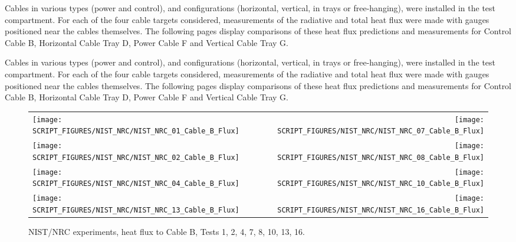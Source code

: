 Cables in various types (power and control), and configurations (horizontal, vertical, in trays or free-hanging), were installed in
the test compartment. For each of the four cable targets considered, measurements of the radiative and total heat flux were made with
gauges positioned near the cables themselves.  The following pages display comparisons of these heat flux predictions and measurements for Control Cable B, Horizontal Cable Tray D, Power Cable F and Vertical Cable Tray G.

\newpage

Cables in various types (power and control), and configurations (horizontal, vertical, in trays or free-hanging), were installed in
the test compartment. For each of the four cable targets considered, measurements of the radiative and total heat flux were made with
gauges positioned near the cables themselves.  The following pages display comparisons of these heat flux predictions and measurements for Control Cable B, Horizontal Cable Tray D, Power Cable F and Vertical Cable Tray G.

\newpage

\begin{figure}[p]
\begin{tabular*}{\textwidth}{l@{\extracolsep{\fill}}r}
\texttt{[image: SCRIPT\_FIGURES/NIST\_NRC/NIST\_NRC\_01\_Cable\_B\_Flux]} &
\texttt{[image: SCRIPT\_FIGURES/NIST\_NRC/NIST\_NRC\_07\_Cable\_B\_Flux]} \\
\texttt{[image: SCRIPT\_FIGURES/NIST\_NRC/NIST\_NRC\_02\_Cable\_B\_Flux]} &
\texttt{[image: SCRIPT\_FIGURES/NIST\_NRC/NIST\_NRC\_08\_Cable\_B\_Flux]} \\
\texttt{[image: SCRIPT\_FIGURES/NIST\_NRC/NIST\_NRC\_04\_Cable\_B\_Flux]} &
\texttt{[image: SCRIPT\_FIGURES/NIST\_NRC/NIST\_NRC\_10\_Cable\_B\_Flux]} \\
\texttt{[image: SCRIPT\_FIGURES/NIST\_NRC/NIST\_NRC\_13\_Cable\_B\_Flux]} &
\texttt{[image: SCRIPT\_FIGURES/NIST\_NRC/NIST\_NRC\_16\_Cable\_B\_Flux]}
\end{tabular*}
\caption[NIST/NRC experiments, heat flux to Cable B, Tests 1, 2, 4, 7, 8, 10, 13, 16]
{NIST/NRC experiments, heat flux to Cable B, Tests 1, 2, 4, 7, 8, 10, 13, 16.}
\label{NIST_NRC_Cable_B_Flux_Closed}
\end{figure}

